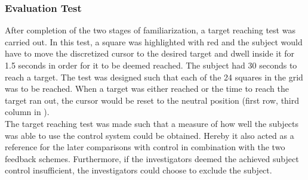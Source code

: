\subsubsection{Evaluation Test}

After completion of the two stages of familiarization, a target reaching test was carried out. In this test, a square was highlighted with red and the subject would have to move the discretized cursor to the desired target and dwell inside it for 1.5 seconds in order for it to be deemed reached. The subject had 30 seconds to reach a target. The test was designed such that each of the 24 squares in the grid was to be reached. When a target was either reached or the time to reach the target ran out, the cursor would be reset to the neutral position (first row, third column in ). \\
The target reaching test was made such that a measure of how well the subjects was able to use the control system could be obtained. Hereby it also acted as a reference for the later comparisons with control in combination with the two feedback schemes. Furthermore, if the investigators deemed the achieved subject control insufficient, the investigators could choose to exclude the subject.       













